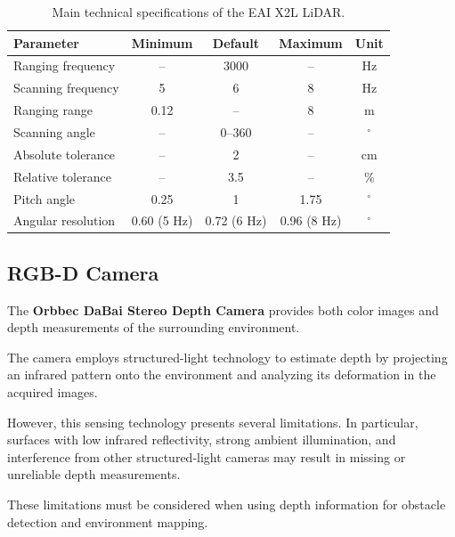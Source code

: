 \documentclass[a4paper,11pt,oneside]{book}
\begin{document}
\begin{table}[H]
    \centering
    \caption{Main technical specifications of the EAI X2L LiDAR.}
    \label{tab:lidar_specs}
    
    \begin{tabular}{lcccc}
        \toprule
        \textbf{Parameter} & \textbf{Minimum} & \textbf{Default} & \textbf{Maximum} & \textbf{Unit} \\
        \midrule
        Ranging frequency & -- & 3000 & -- & Hz \\
        Scanning frequency & 5 & 6 & 8 & Hz \\
        Ranging range & 0.12 & -- & 8 & m \\
        Scanning angle & -- & 0--360 & -- & $^\circ$ \\
        Absolute tolerance & -- & 2 & -- & cm \\
        Relative tolerance & -- & 3.5 & -- & \% \\
        Pitch angle & 0.25 & 1 & 1.75 & $^\circ$ \\
        Angular resolution & 0.60 (5 Hz) & 0.72 (6 Hz) & 0.96 (8 Hz) & $^\circ$ \\
        \bottomrule
    \end{tabular}
\end{table}

\subsection{RGB-D Camera}

The \textbf{Orbbec DaBai Stereo Depth Camera} provides
both color images and depth measurements of the
surrounding environment.

The camera employs structured-light technology to
estimate depth by projecting an infrared pattern
onto the environment and analyzing its deformation
in the acquired images.

However, this sensing technology presents several
limitations. In particular, surfaces with low
infrared reflectivity, strong ambient illumination,
and interference from other structured-light cameras
may result in missing or unreliable depth
measurements.

These limitations must be considered when using
depth information for obstacle detection and
environment mapping.
\end{document}
